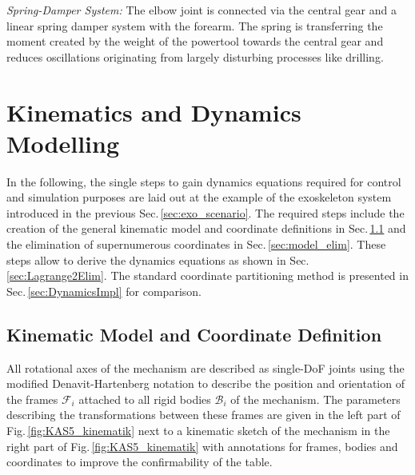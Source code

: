 \documentclass{svproc}
\newcommand{\body}[1]{{\mathcal{B}}_{#1}}
\newcommand{\ks}[1]{{\mathcal{F}}_{#1}}
\begin{document}
\emph{Spring-Damper System:}
The elbow joint is connected via the central gear and a linear spring damper system with the forearm.
The spring is transferring the moment created by the weight of the powertool towards the central gear and reduces oscillations originating from largely disturbing processes like drilling.

\section{Kinematics and Dynamics Modelling}
\label{sec:model}

In the following, the single steps to gain dynamics equations required for control and simulation purposes are laid out at the example of the exoskeleton system introduced in the previous Sec.\,\ref{sec:exo_scenario}.
The required steps include the creation of the general kinematic model and coordinate definitions in Sec.\,\ref{sec:model_fullcoord} and the elimination of supernumerous coordinates in Sec.\,\ref{sec:model_elim}.
These steps allow to derive the dynamics equations as shown in Sec.\,\ref{sec:Lagrange2Elim}.
The standard coordinate partitioning method is presented in Sec.\,\ref{sec:DynamicsImpl} for comparison.

\subsection{Kinematic Model and Coordinate Definition}
\label{sec:model_fullcoord}

All rotational axes of the mechanism are described as single-DoF joints using the modified Denavit-Hartenberg notation \cite{KhalilBen1995} to describe the position and orientation of the frames $\ks{i}$ attached to all rigid bodies $\body{i}$ of the mechanism.
The parameters describing the transformations between these frames are given in the left part of Fig.\,\ref{fig:KAS5_kinematik} next to a kinematic sketch of the mechanism in the right part of Fig.\,\ref{fig:KAS5_kinematik} with annotations for frames, bodies and coordinates to improve the confirmability of the table.
\end{document}
